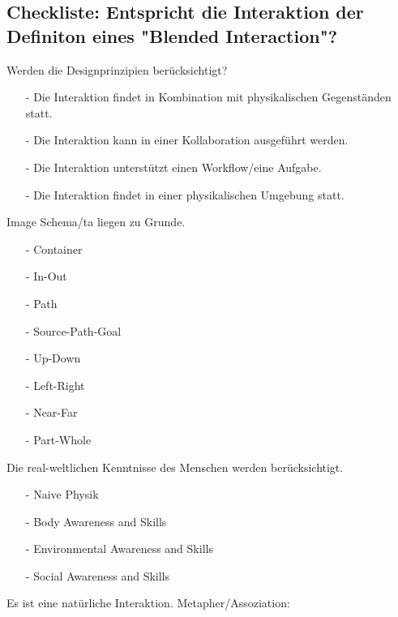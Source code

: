 \subsection*{Checkliste: Entspricht die Interaktion der Definiton eines "Blended Interaction"?}
\checkbox{\designprinciples} Werden die Designprinzipien berücksichtigt?
\begin{itemize}
\item[-] Die Interaktion findet in Kombination mit physikalischen Gegenständen statt.
\item[-] Die Interaktion kann in einer Kollaboration ausgeführt werden.
\item[-] Die Interaktion unterstützt einen Workflow/eine Aufgabe.
\item[-] Die Interaktion findet in einer physikalischen Umgebung statt.
\end{itemize} 

\checkbox{\imageschemata} Image Schema/ta liegen zu Grunde.
\begin{itemize}
\item[-] \checkbox{\imageSchemaContainer} Container
\item[-] \checkbox{\imageSchemaInOut} In-Out
\item[-] \checkbox{\imageSchemaPath} Path
\item[-] \checkbox{\imageSchemaSourcePathGoal} Source-Path-Goal
\item[-] \checkbox{\imageSchemaUpDown} Up-Down
\item[-] \checkbox{\imageSchemaLeftRight} Left-Right
\item[-] \checkbox{\imageSchemaNearFar} Near-Far
\item[-] \checkbox{\imageSchemaPartWhole} Part-Whole
\end{itemize}

\checkbox{\realworld} Die real-weltlichen Kenntnisse des Menschen werden berücksichtigt.
\begin{itemize}
\item[-] \checkbox{\realworldNaivePhysic} Naive Physik
\item[-] \checkbox{\realworldBodyAwareness} Body Awareness and Skills
\item[-] \checkbox{\realworldEnvironmentAwareness} Environmental Awareness and Skills
\item[-] \checkbox{\realworldSocialAwareness} Social Awareness and Skills
\end{itemize}

\checkbox{\metaphor} Es ist eine natürliche Interaktion. Metapher/Assoziation: \metaphordesc

